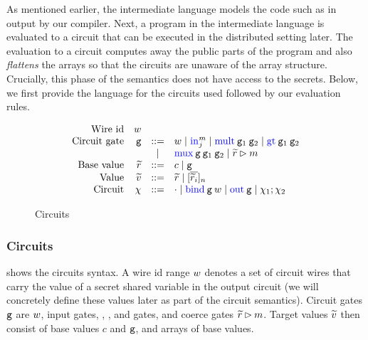As mentioned earlier, the intermediate language models the code such as in  output by our compiler. 
Next, a program in the intermediate language is evaluated to a circuit that can be executed in the distributed setting later. The evaluation to a circuit computes away the public parts of the program and also \emph{flattens} the arrays so that the circuits are unaware of the array structure. 
Crucially, this phase of the semantics does not have access to the secrets.
Below, we first provide the language for the circuits used followed by our evaluation rules.


\begin{figure}
  \small
  \[
  \begin{array}{rrcl}
    \ftext{Wire id} & \wire &&\\
    \ftext{Circuit gate} & \gate & ::= & \wire \mid \kw{in}^{m}_{j} \mid \kw{mult}\:\gate_1\:\gate_{2} \mid \kw{gt}\:\gate_{1}\:\gate_{2}\\
    & & \mid & \kw{mux}\:\gate\:\gate_{1}\:\gate_{2} \mid \bval \rhd m\\
    \ftext{Base value} & \bval & ::= & c \mid \gate\\
    \ftext{Value} & \val & ::= & \bval \mid [\overline{\bval_{i}}]_{n}\\
    \ftext{Circuit} & \crct & ::= & \cdot \mid \kw{bind}\:\gate\:\wire \mid \kw{out}\:\gate \mid \crct_{1}; \crct_{2}
  \end{array}
  \]
\caption{Circuits   }
\label{fig:circuits}
\end{figure}

\subsubsection*{Circuits}
 shows the circuits syntax. A wire id range
$w$ denotes a set of circuit wires that carry the value of a secret
shared variable in the output circuit (we will concretely define these
values later as part of the circuit semantics). Circuit gates $\mathtt{g}$
are $w$, input gates, , , and  gates, and
coerce gates $\widetilde{r} \rhd m$.  Target values $\widetilde{v}$
then consist of base values $c$ and $\mathtt{g}$, and arrays of base
values. \\





